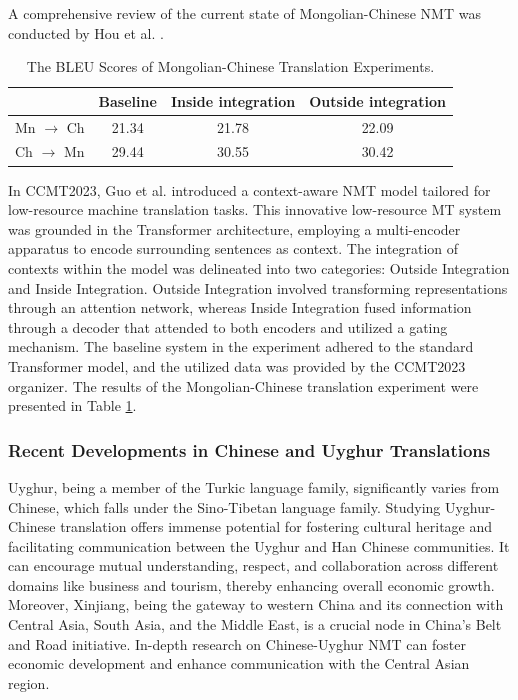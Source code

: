 \documentclass[acmsmall]{acmart}
\begin{document}
A comprehensive review of the current state of Mongolian-Chinese NMT was conducted by Hou et al. \cite{4-2b3}.

\begin{table}[htbp]
    \centering
    \caption{The BLEU Scores of Mongolian-Chinese Translation Experiments.}
	\label{Guo}
    \begin{tabular}{cccc}
        \toprule
        & Baseline & Inside integration & Outside integration \\
        \midrule
        Mn $\rightarrow$ Ch & 21.34 & 21.78 & 22.09 \\
        Ch $\rightarrow$ Mn & 29.44 & 30.55 & 30.42 \\
        \bottomrule
    \end{tabular}
\end{table}




\color{red}
In CCMT2023, Guo et al. \cite{10.1007/978-981-99-7894-69} introduced a context-aware NMT model tailored for low-resource machine translation tasks. This innovative low-resource MT system was grounded in the Transformer architecture, employing a multi-encoder apparatus to encode surrounding sentences as context. The integration of contexts within the model was delineated into two categories: Outside Integration and Inside Integration. Outside Integration involved transforming representations through an attention network, whereas Inside Integration fused information through a decoder that attended to both encoders and utilized a gating mechanism. The baseline system in the experiment adhered to the standard Transformer model, and the utilized data was provided by the CCMT2023 organizer. The results of the Mongolian-Chinese translation experiment were presented in Table \ref{Guo}.
\color{black}


\subsubsection{Recent Developments in Chinese and Uyghur Translations}

Uyghur, being a member of the Turkic language family, significantly varies from Chinese, which falls under the Sino-Tibetan language family. Studying Uyghur-Chinese translation offers immense potential for fostering cultural heritage and facilitating communication between the Uyghur and Han Chinese communities. It can encourage mutual understanding, respect, and collaboration across different domains like business and tourism, thereby enhancing overall economic growth. Moreover, Xinjiang, being the gateway to western China and its connection with Central Asia, South Asia, and the Middle East, is a crucial node in China's Belt and Road initiative. In-depth research on Chinese-Uyghur NMT can foster economic development and enhance communication with the Central Asian region.
\end{document}
